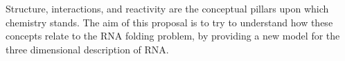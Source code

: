 Structure, interactions, and reactivity are the conceptual pillars
upon which chemistry stands. The aim of this proposal is to try to
understand how these concepts relate to the RNA folding problem, by
providing a new model for the three dimensional description of RNA.








